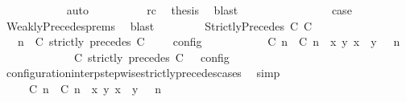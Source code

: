 \begin{isabellebody}
\ \ \ \ \ \ \ \ \ \ \isamarkupfalse%
\ auto\isanewline
\ \ \ \ \ \ \ \ \isamarkupfalse%
\ rc\ \isamarkupfalse%
\ {\isacharquery}thesis\ \isamarkupfalse%
\ blast\isanewline
\ \ \ \ \ \ \isamarkupfalse%
\isanewline
\ \ \ \ \ \ \isamarkupfalse%
\ \isamarkupfalse%
\ {\isacharquery}case\ \isamarkupfalse%
\ WeaklyPrecedes{\isachardot}prems{\isacharparenleft}{}{\isacharparenright}\ \isamarkupfalse%
\ blast\isanewline
\ \ \isamarkupfalse%
\isanewline
\ \ \ \ \isamarkupfalse%
\ {\isacharparenleft}StrictlyPrecedes\ C\ C\isanewline
\ \ \ \ \ \ \isamarkupfalse%
\ {\isacartoucheopen}{\isasymlbrakk}\ {\isasymGamma}{\isacharcomma}\ n\ {\isasymturnstile}\ {\isacharparenleft}{\isacharparenleft}C\ strictly\ precedes\ C\ {\isacharhash}\ {\isasymPsi}{\isacharparenright}\ {\isasymtriangleright}\ {\isasymPhi}\ {\isasymrbrakk}\isactrlsub c\isactrlsub o\isactrlsub n\isactrlsub f\isactrlsub i\isactrlsub g\ {\isacharequal}\isanewline
\ \ \ \ \ \ \ \ {\isasymlbrakk}\ {\isacharparenleft}{\isacharparenleft}{\isasymlceil}{\isacharhash}\isactrlsup {\isasymle}\ C\ n{\isacharcomma}\ {\isacharhash}\isactrlsup {\isacharless}\ C\ n{\isasymrceil}\ {\isasymin}\ {\isacharparenleft}{\isasymlambda}{\isacharparenleft}x{\isacharcomma}\ y{\isacharparenright}{\isachardot}\ x\ {\isasymle}\ y{\isacharparenright}{\isacharparenright}\ {\isacharhash}\ {\isasymGamma}{\isacharparenright}{\isacharcomma}\ n\isanewline
\ \ \ \ \ \ \ \ \ \ {\isasymturnstile}\ {\isasymPsi}\ {\isasymtriangleright}\ {\isacharparenleft}{\isacharparenleft}C\ strictly\ precedes\ C\ {\isacharhash}\ {\isasymPhi}{\isacharparenright}\ {\isasymrbrakk}\isactrlsub c\isactrlsub o\isactrlsub n\isactrlsub f\isactrlsub i\isactrlsub g{\isacartoucheclose}\isanewline
\ \ \ \ \ \ \ \ \isamarkupfalse%
\ configuration{\isacharunderscore}interp{\isacharunderscore}stepwise{\isacharunderscore}strictly{\isacharunderscore}precedes{\isacharunderscore}cases\ \isamarkupfalse%
\ simp\isanewline
\ \ \ \ \ \ \isamarkupfalse%
\ \isamarkupfalse%
\ {\isacartoucheopen}{\isasymrho}\ {\isasymin}\ {\isasymlbrakk}\ {\isacharparenleft}{\isacharparenleft}{\isasymlceil}{\isacharhash}\isactrlsup {\isasymle}\ C\ n{\isacharcomma}\ {\isacharhash}\isactrlsup {\isacharless}\ C\ n{\isasymrceil}\ {\isasymin}\ {\isacharparenleft}{\isasymlambda}{\isacharparenleft}x{\isacharcomma}\ y{\isacharparenright}{\isachardot}\ x\ {\isasymle}\ y{\isacharparenright}{\isacharparenright}\ {\isacharhash}\ {\isasymGamma}{\isacharparenright}{\isacharcomma}\ n\isanewline

\end{isabellebody}
